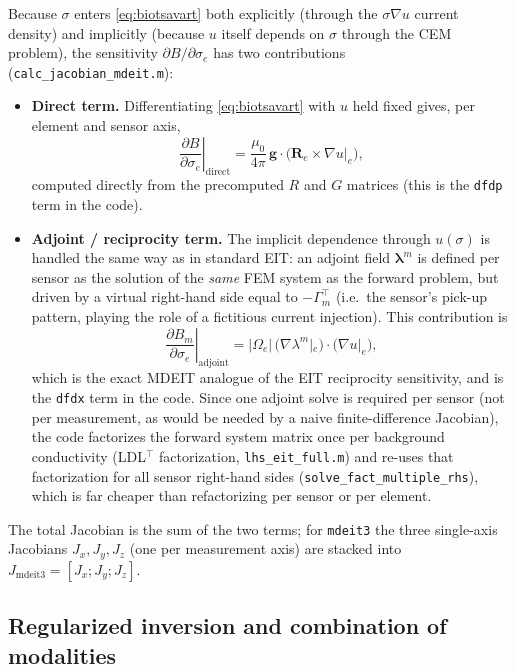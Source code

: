 \documentclass[11pt]{article}
\newcommand{\bg}{\mathbf{g}}
\begin{document}
Because $\sigma$ enters \eqref{eq:biotsavart} both explicitly (through the $\sigma\nabla u$ current density) and implicitly (because $u$ itself depends on $\sigma$ through the CEM problem), the sensitivity $\partial B/\partial\sigma_e$ has two contributions (\texttt{calc\_jacobian\_mdeit.m}):
\begin{itemize}
\item \textbf{Direct term.} Differentiating \eqref{eq:biotsavart} with $u$ held fixed gives, per element and sensor axis,
\begin{equation}
\left.\frac{\partial B}{\partial \sigma_e}\right|_\text{direct} = \frac{\mu_0}{4\pi}\,\bg\cdot\bigl(\mathbf{R}_e\times\nabla u|_e\bigr),
\end{equation}
computed directly from the precomputed $R$ and $G$ matrices (this is the \texttt{dfdp} term in the code).
\item \textbf{Adjoint / reciprocity term.} The implicit dependence through $u(\sigma)$ is handled the same way as in standard EIT: an adjoint field $\boldsymbol\lambda^m$ is defined per sensor as the solution of the \emph{same} FEM system as the forward problem, but driven by a virtual right-hand side equal to $-\Gamma_m^{\!\top}$ (i.e.\ the sensor's pick-up pattern, playing the role of a fictitious current injection). This contribution is
\begin{equation}
\left.\frac{\partial B_m}{\partial\sigma_e}\right|_\text{adjoint} = |\Omega_e|\,\bigl(\nabla\lambda^m|_e\bigr)\cdot\bigl(\nabla u|_e\bigr),
\end{equation}
which is the exact MDEIT analogue of the EIT reciprocity sensitivity, and is the \texttt{dfdx} term in the code. Since one adjoint solve is required per sensor (not per measurement, as would be needed by a naive finite-difference Jacobian), the code factorizes the forward system matrix once per background conductivity (LDL$^\top$ factorization, \texttt{lhs\_eit\_full.m}) and re-uses that factorization for all sensor right-hand sides (\texttt{solve\_fact\_multiple\_rhs}), which is far cheaper than refactorizing per sensor or per element.
\end{itemize}
The total Jacobian is the sum of the two terms; for \texttt{mdeit3} the three single-axis Jacobians $J_x,J_y,J_z$ (one per measurement axis) are stacked into $J_\text{mdeit3} = [J_x;J_y;J_z]$.

\subsection{Regularized inversion and combination of modalities}
\end{document}
